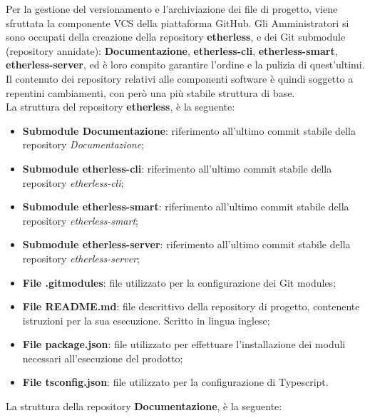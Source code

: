 			Per la gestione del versionamento e l'archiviazione dei file di progetto, viene sfruttata la componente VCS della piattaforma GitHub. Gli Amministratori si sono occupati della creazione della repository \textbf{etherless}, e dei Git submodule (repository annidate): \textbf{Documentazione}, \textbf{etherless-cli}, \textbf{etherless-smart}, \textbf{etherless-server},  ed è loro compito garantire l'ordine e la pulizia di quest'ultimi. Il contenuto dei repository relativi alle componenti software è quindi soggetto a repentini cambiamenti, con però una più stabile struttura di base.\\
			La struttura del repository \textbf{etherless}, è la seguente:
			\begin{itemize}
				\item \textbf{Submodule Documentazione}: riferimento all'ultimo commit stabile della repository \textit{Documentazione};
				\item \textbf{Submodule etherless-cli}: riferimento all'ultimo commit stabile della repository \textit{etherless-cli};
				\item \textbf{Submodule etherless-smart}: riferimento all'ultimo commit stabile della repository \textit{etherless-smart};
				\item \textbf{Submodule etherless-server}: riferimento all'ultimo commit stabile della repository \textit{etherless-server};
				\item \textbf{File .gitmodules}: file utilizzato per la configurazione dei Git modules;
				\item \textbf{File README.md}: file descrittivo della repository di progetto, contenente istruzioni per la sua esecuzione. Scritto in lingua inglese;
				\item \textbf{File package.json}: file utilizzato per effettuare l'installazione dei moduli necessari all'esecuzione del prodotto;
				\item \textbf{File tsconfig.json}: file utilizzato per la configurazione di Typescript.
			\end{itemize}
			La struttura della repository \textbf{Documentazione}, è la seguente:
